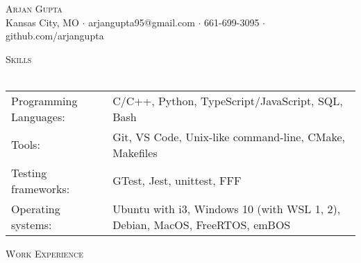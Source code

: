 \documentclass[a4paper]{article}
\newcommand{\lineunder} {
    \vspace*{-8pt} \\
    \hspace*{-18pt} \hrulefill \\
}
\newcommand{\header} [1] {
    {\hspace*{-18pt}\vspace*{6pt} \textsc{#1}}
    \vspace*{-6pt} \lineunder
}
\begin{document}
\vspace*{-40pt}

    

\vspace*{-10pt}
\begin{center}
	{\Huge \scshape {Arjan Gupta}}\\
	Kansas City, MO $\cdot$ arjangupta95@gmail.com $\cdot$ 661-699-3095 $\cdot$ github.com/arjangupta\\
\end{center}

\header{Skills}
\begin{tabular}{ l l }
	Programming Languages: & C/C++, Python, TypeScript/JavaScript, SQL, Bash                            \\
	Tools:                 & Git, VS Code, Unix-like command-line, CMake, Makefiles                     \\
	Testing frameworks:    & GTest, Jest, unittest, FFF                                                 \\
	Operating systems:     & Ubuntu with i3, Windows 10 (with WSL 1, 2), Debian, MacOS, FreeRTOS, emBOS \\
\end{tabular}
\vspace{2mm}

\header{Work Experience}
\vspace{1mm}
\end{document}

